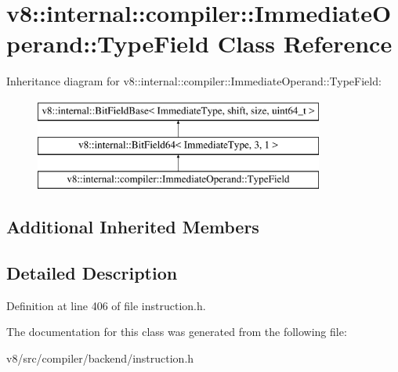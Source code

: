 \hypertarget{classv8_1_1internal_1_1compiler_1_1ImmediateOperand_1_1TypeField}{}\section{v8\+:\+:internal\+:\+:compiler\+:\+:Immediate\+Operand\+:\+:Type\+Field Class Reference}
\label{classv8_1_1internal_1_1compiler_1_1ImmediateOperand_1_1TypeField}
Inheritance diagram for v8\+:\+:internal\+:\+:compiler\+:\+:Immediate\+Operand\+:\+:Type\+Field\+:\begin{figure}[H]
\begin{center}
\leavevmode
\includegraphics[height=3.000000cm]{classv8_1_1internal_1_1compiler_1_1ImmediateOperand_1_1TypeField}
\end{center}
\end{figure}
\subsection*{Additional Inherited Members}


\subsection{Detailed Description}


Definition at line 406 of file instruction.\+h.



The documentation for this class was generated from the following file\+:\begin{DoxyCompactItemize}
\item 
v8/src/compiler/backend/instruction.\+h\end{DoxyCompactItemize}
